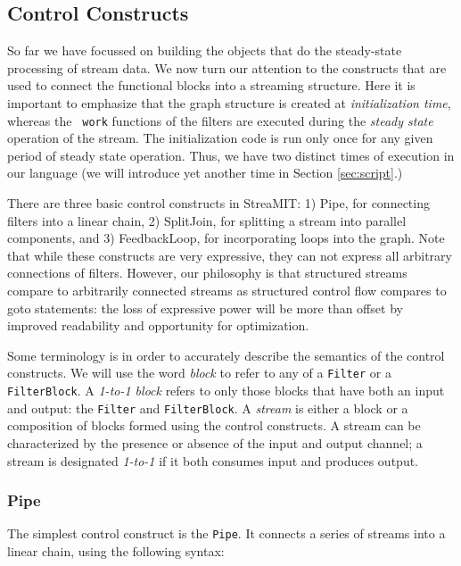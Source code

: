 \subsection{Control Constructs}
\protect\label{sec:control}

So far we have focussed on building the objects that do the
steady-state processing of stream data.  We now turn our attention to
the constructs that are used to connect the functional blocks into a
streaming structure.  Here it is important to emphasize that the graph
structure is created at {\it initialization time}, whereas the {\tt
work} functions of the filters are executed during the {\it steady
state} operation of the stream.  The initialization code is run only
once for any given period of steady state operation.  Thus, we have
two distinct times of execution in our language (we will introduce yet
another time in Section {\ref{sec:script}}.)

There are three basic control constructs in StreaMIT: 1) Pipe, for
connecting filters into a linear chain, 2) SplitJoin, for splitting a
stream into parallel components, and 3) FeedbackLoop, for
incorporating loops into the graph.  Note that while these constructs
are very expressive, they can not express all arbitrary connections of
filters.  However, our philosophy is that structured streams compare
to arbitrarily connected streams as structured control flow compares
to goto statements: the loss of expressive power will be more than
offset by improved readability and opportunity for optimization.

Some terminology is in order to accurately describe the semantics of
the control constructs.  We will use the word {\it block} to refer to
any of a {\tt Filter} or a {\tt FilterBlock}.
A {\it 1-to-1 block} refers to
only those blocks that have both an input and output: the {\tt Filter}
and {\tt FilterBlock}.  A {\it stream} is either a block or a
composition of blocks formed using the control constructs.  A stream
can be characterized by the presence or absence of the input and
output channel; a stream is designated {\it 1-to-1} if it both
consumes input and produces output.

\subsubsection{Pipe}

The simplest control construct is the {\tt Pipe}.  It connects a
series of streams into a linear chain, using the following syntax:


